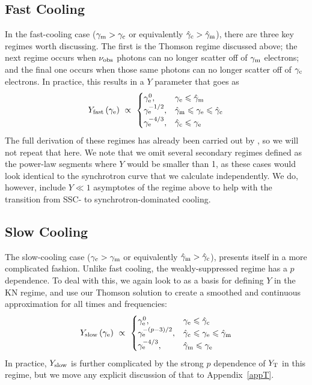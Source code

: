 \documentclass[fleqn,usenatbib]{mnras}
\begin{document}
\subsection{Fast Cooling}

In the fast-cooling case ($\gamma_{\rm m}>\gamma_{\rm c}$ or equivalently $\hat{\gamma}_{\rm c}>\hat{\gamma}_{\rm m}$), there are three key regimes worth discussing. The first is the Thomson regime discussed above; the next regime occurs when $\nu_{\rm{obs}}$ photons can no longer scatter off of $\gamma_{\rm m}$ electrons; and the final one occurs when those same photons can no longer scatter off of $\gamma_{\rm c}$ electrons. In practice, this results in a $Y$ parameter that goes as 
\begin{equation}
Y_{\text{fast}}\left(\gamma_{\rm e}\right)\  \propto\ \begin{cases} 
      \gamma_{\rm e}^0, & \gamma_{\rm e} \leq \hat{\gamma}_{\rm m} \\
     \gamma_{\rm e}^{-1/2}, & \hat{\gamma}_{\rm m} \leq \gamma_{\rm e} \leq \hat{\gamma}_{\rm c} \\
      \gamma_{\rm e}^{-4/3}, & \hat{\gamma}_{\rm c}  \leq \gamma_{\rm e}
   \end{cases}
\end{equation}
The full derivation of these regimes has already been carried out by \citet{Nakar}, so we will not repeat that here. We note that we omit several secondary regimes \citet{Nakar} defined as the power-law segments where $Y$ would be smaller than 1, as these cases would look identical to the synchrotron curve that we calculate independently. We do, however, include $Y \ll1$ asymptotes of the regime above to help with the transition from SSC- to synchrotron-dominated cooling.

\subsection{Slow Cooling}

The slow-cooling case ($\gamma_{\rm c}>\gamma_{\rm m}$ or equivalently $\hat{\gamma}_{\rm m}>\hat{\gamma}_{\rm c}$), presents itself in a more complicated fashion. Unlike fast cooling, the weakly-suppressed regime has a $p$ dependence. To deal with this, we again look to \citet{Nakar} as a basis for defining $Y$ in the KN regime, and use our Thomson solution to create a smoothed and continuous approximation for all times and frequencies:
\begin{equation}
Y_{\text{slow}}\left(\gamma_{\rm e}\right)\  \propto\ \begin{cases} 
      \gamma_{\rm e}^0, & \gamma_{\rm e} \leq \hat{\gamma}_{\rm c} \\
     \gamma_{\rm e}^{-(p-3)/2}, & \hat{\gamma}_{\rm c} \leq \gamma_{\rm e} \leq \hat{\gamma}_{\rm m} \\
      \gamma_{\rm e}^{-4/3}, & \hat{\gamma}_{\rm m}  \leq \gamma_{\rm e}
   \end{cases}
\end{equation}
In practice, $Y_{\rm slow}$ is further complicated by the strong $p$ dependence of $Y_{\rm T}$ in this regime, but we move any explicit discussion of that to Appendix~\ref{appT}. 
\end{document}
